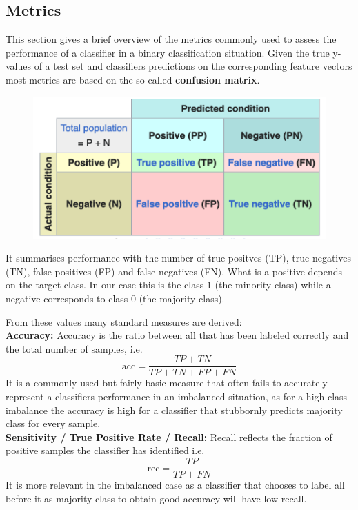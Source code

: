 
\subsection{Metrics}

This section gives a brief overview of the metrics commonly used to assess the performance of a classifier in a binary classification situation.
Given the true y-values of a test set and classifiers predictions on the corresponding feature vectors most metrics are based on the so called \textbf{confusion matrix}.

\begin{figure}[H]
	\centering
  	\includegraphics[width=0.75\linewidth]{assets/confusion_matrix.png}
  	\label{fig:confusion_matrix}
\end{figure}

It summarises performance with the number of true positves (TP), true negatives (TN), false positives (FP) and false negatives (FN). 
What is a positive depends on the target class. In our case this is the class $1$ (the minority class) while a negative corresponds to class $0$ (the majority class).

From these values many standard measures are derived:\\

\textbf{Accuracy:}
Accuracy is the ratio between all that has been labeled correctly and the total number of samples, i.e.
\[
	\text{acc} = \frac{TP + TN}{TP + TN + FP + FN}
\]
It is a commonly used but fairly basic measure that often fails to accurately represent a classifiers performance in an imbalanced situation,
as for a high class imbalance the accuracy is high for a classifier that stubbornly predicts majority class for every sample.\\

\textbf{Sensitivity / True Positive Rate / Recall:}
Recall reflects the fraction of positive samples the classifier has identified i.e.
\[
	\text{rec} = \frac{TP}{TP + FN}
\]
It is more relevant in the imbalanced case as a classifier that chooses to label all before it as majority class to obtain good accuracy will have low recall.\\

